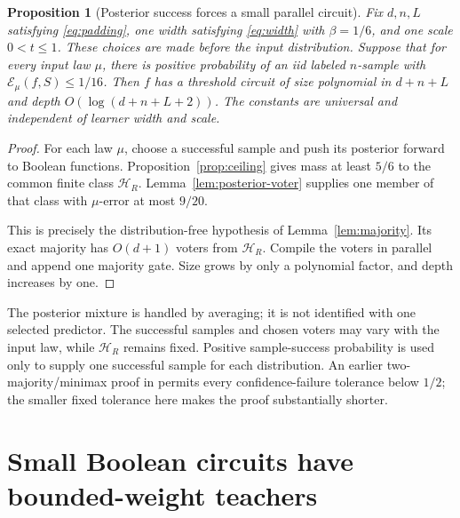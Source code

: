 \documentclass[11pt]{article}
\newtheorem{proposition}[theorem]{Proposition}
\theoremstyle{remark}\newtheorem{remark}[theorem]{Remark}
\begin{document}
\begin{proposition}[Posterior success forces a small parallel circuit]
\label{prop:success-circuit}
Fix $d,n,L$ satisfying \eqref{eq:padding}, one width satisfying
\eqref{eq:width} with $\beta=1/6$, and one scale $0<t\le1$.
These choices are made before the input distribution.
Suppose that for every input law $\mu$, there is positive probability of
an iid labeled $n$-sample with $\mathcal E_\mu(f,S)\le1/16$.
Then $f$ has a threshold circuit of size polynomial in $d+n+L$ and depth
$O(\log(d+n+L+2))$. The constants are universal and independent of
learner width and scale.
\end{proposition}
\begin{proof}
For each law $\mu$, choose a successful sample and push its posterior
forward to Boolean functions. Proposition~\ref{prop:ceiling} gives mass
at least $5/6$ to the common finite class $\mathcal H_R$.
Lemma~\ref{lem:posterior-voter} supplies one member of that class with
$\mu$-error at most $9/20$.

This is precisely the distribution-free hypothesis of
Lemma~\ref{lem:majority}. Its exact majority has $O(d+1)$ voters from
$\mathcal H_R$. Compile the voters in parallel and append one majority
gate. Size grows by only a polynomial factor, and depth increases by one.
\end{proof}

The posterior mixture is handled by averaging; it is not identified with
one selected predictor. The successful samples and chosen voters may
vary with the input law, while $\mathcal H_R$ remains fixed. Positive
sample-success probability is used only to supply one successful sample
for each distribution. An earlier two-majority/minimax proof in
\cite{barriers} permits every confidence-failure tolerance below $1/2$;
the smaller fixed tolerance here makes the proof substantially shorter.

\section{Small Boolean circuits have bounded-weight teachers}
\end{document}
